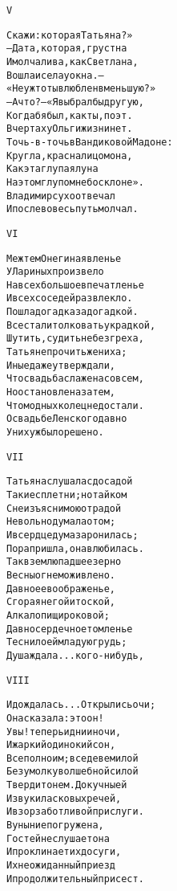\begin{minipage}[t]{\dimexpr 0.5\textwidth -\tabcolsep-.5pt}
\begin{alltt}\normalfont\centering
V

Скажи: которая Татьяна?»
— Да та, которая, грустна
И молчалива, как Светлана,
Вошла и села у окна. —
«Неужто ты влюблен в меньшую?»
— А что? — «Я выбрал бы другую,
Когда б я был, как ты, поэт.
В чертах у Ольги жизни нет.
Точь-в-точь в Вандиковой Мадоне:
Кругла, красна лицом она,
Как эта глупая луна
На этом глупом небосклоне».
Владимир сухо отвечал
И после во весь путь молчал.
\end{alltt}
\end{minipage}

\begin{minipage}[t]{\dimexpr 0.5\textwidth -\tabcolsep-.5pt}
\begin{alltt}\normalfont\centering
VI

Меж тем Онегина явленье
У Лариных произвело
На всех большое впечатленье
И всех соседей развлекло.
Пошла догадка за догадкой.
Все стали толковать украдкой,
Шутить, судить не без греха,
Татьяне прочить жениха;
Иные даже утверждали,
Что свадьба слажена совсем,
Но остановлена затем,
Что модных колец не достали.
О свадьбе Ленского давно
У них уж было решено.
\end{alltt}
\end{minipage}
\clearpage

\begin{minipage}[t]{\dimexpr 0.5\textwidth -\tabcolsep-.5pt}
\begin{alltt}\normalfont\centering
VII

Татьяна слушала с досадой
Такие сплетни; но тайком
С неизъяснимою отрадой
Невольно думала о том;
И в сердце дума заронилась;
Пора пришла, она влюбилась.
Так в землю падшее зерно
Весны огнем оживлено.
Давно ее воображенье,
Сгорая негой и тоской,
Алкало пищи роковой;
Давно сердечное томленье
Теснило ей младую грудь;
Душа ждала... кого-нибудь,
\end{alltt}
\end{minipage}

\begin{minipage}[t]{\dimexpr 0.5\textwidth -\tabcolsep-.5pt}
\begin{alltt}\normalfont\centering
VIII

И дождалась... Открылись очи;
Она сказала: это он!
Увы! теперь и дни и ночи,
И жаркий одинокий сон,
Все полно им; все деве милой
Без умолку волшебной силой
Твердит о нем. Докучны ей
И звуки ласковых речей,
И взор заботливой прислуги.
В уныние погружена,
Гостей не слушает она
И проклинает их досуги,
Их неожиданный приезд
И продолжительный присест.
\end{alltt}
\end{minipage}
\clearpage

